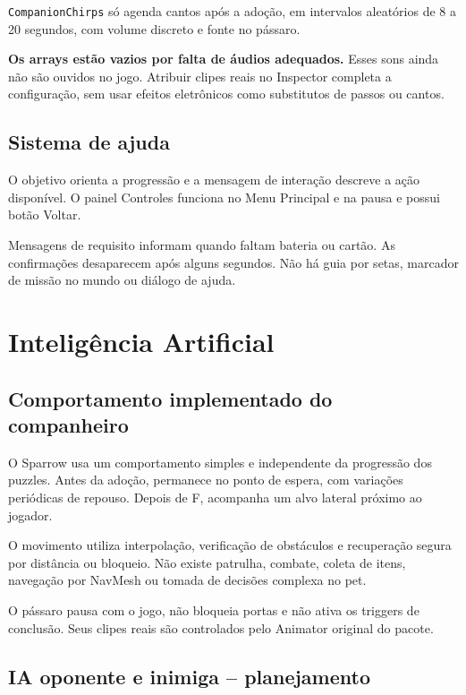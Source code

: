 \documentclass[12pt,a4paper]{article}
\begin{document}
\texttt{CompanionChirps} só agenda cantos após a adoção, em intervalos
aleatórios de 8 a 20 segundos, com volume discreto e fonte no pássaro.

\textbf{Os arrays estão vazios por falta de áudios adequados.}
Esses sons ainda não são ouvidos no jogo. Atribuir clipes reais no
Inspector completa a configuração, sem usar efeitos eletrônicos
como substitutos de passos ou cantos.

\subsection{Sistema de ajuda}

O objetivo orienta a progressão e a mensagem de interação descreve
a ação disponível. O painel Controles funciona no Menu Principal
e na pausa e possui botão Voltar.

Mensagens de requisito informam quando faltam bateria ou cartão.
As confirmações desaparecem após alguns segundos. Não há guia
por setas, marcador de missão no mundo ou diálogo de ajuda.



\section{Inteligência Artificial}

\subsection{Comportamento implementado do companheiro}

O Sparrow usa um comportamento simples e independente da progressão
dos puzzles. Antes da adoção, permanece no ponto de espera, com
variações periódicas de repouso. Depois de F, acompanha um alvo
lateral próximo ao jogador.

O movimento utiliza interpolação, verificação de obstáculos e
recuperação segura por distância ou bloqueio. Não existe patrulha,
combate, coleta de itens, navegação por NavMesh ou tomada de decisões
complexa no pet.

O pássaro pausa com o jogo, não bloqueia portas e não ativa os
triggers de conclusão. Seus clipes reais são controlados pelo
Animator original do pacote.

\subsection{IA oponente e inimiga -- planejamento}
\end{document}
